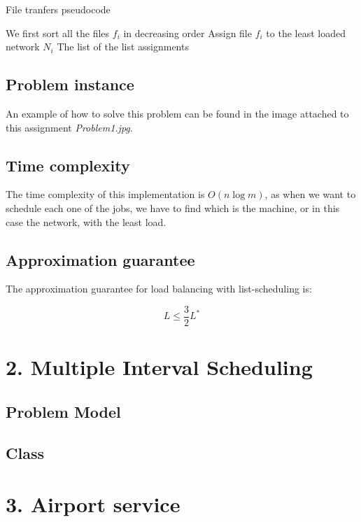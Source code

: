 \documentclass{article}
\begin{document}
\begin{algorithm}[H]
\caption{File tranfers pseudocode}
\begin{algorithmic}[1]
\State We first sort all the files $f_i$ in decreasing order
 \State Assign file $f_i$ to the least loaded network $N_i$
\EndWhile
\State \Return The list of the list assignments
\end{algorithmic}
\end{algorithm}

\subsection*{Problem instance}

An example of how to solve this problem can be found in the image attached to this assignment \textit{Problem1.jpg}.

\subsection*{Time complexity}

The time complexity of this implementation is $O(n\log m)$, as when we want to schedule each one of the jobs, we have to find which is the machine, or in this case the network, with the least load.

\subsection*{Approximation guarantee}

The approximation guarantee for load balancing with list-scheduling is:

$$L\leq \frac{3}{2} L^{\ast}$$

\section*{2. Multiple Interval Scheduling}

\subsection*{Problem Model}

\subsection*{Class}

\section*{3. Airport service}
\end{document}
